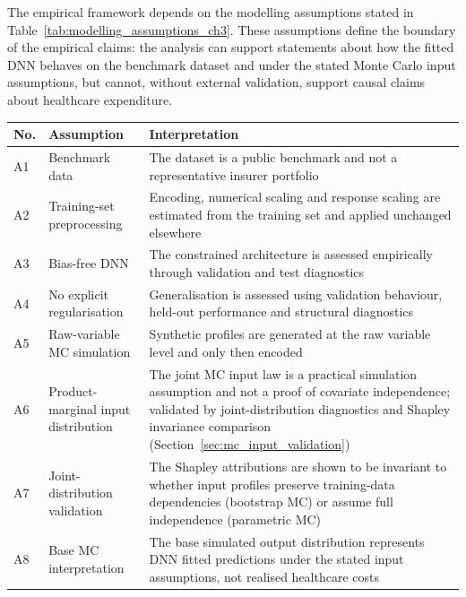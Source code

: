 The empirical framework depends on the modelling assumptions stated in
Table~\ref{tab:modelling_assumptions_ch3}. These assumptions define the
boundary of the empirical claims: the analysis can support statements about
how the fitted DNN behaves on the benchmark dataset and under the stated Monte
Carlo input assumptions, but cannot, without external validation, support
causal claims about healthcare expenditure.

\begin{table}[H]
\centering
\small
\renewcommand{\arraystretch}{1.16}
\begin{tabular}{p{}p{}p{}}
\toprule
\textbf{No.} & \textbf{Assumption} & \textbf{Interpretation} \\
\midrule
A1 &
Benchmark data &
The dataset is a public benchmark and not a representative insurer portfolio \\

A2 &
Training-set preprocessing &
Encoding, numerical scaling and response scaling are estimated from the training set and applied unchanged elsewhere \\

A3 &
Bias-free DNN &
The constrained architecture is assessed empirically through validation and test diagnostics \\

A4 &
No explicit regularisation &
Generalisation is assessed using validation behaviour, held-out performance and structural diagnostics \\

A5 &
Raw-variable MC simulation &
Synthetic profiles are generated at the raw variable level and only then encoded \\

A6 &
Product-marginal input distribution &
The joint MC input law is a practical simulation assumption and not a proof of covariate independence; validated by joint-distribution diagnostics and Shapley invariance comparison (Section~\ref{sec:mc_input_validation}) \\

A7 &
Joint-distribution validation &
The Shapley attributions are shown to be invariant to whether input profiles preserve training-data dependencies (bootstrap MC) or assume full independence (parametric MC) \\

A8 &
Base MC interpretation &
The base simulated output distribution represents DNN fitted predictions under the stated input assumptions, not realised healthcare costs \\


\end{tabular}
\end{table}
